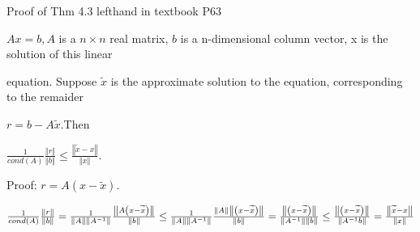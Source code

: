 \documentclass{article}
\begin{document}
Proof of Thm 4.3 lefthand in textbook P63

$Ax=b,A$ is a $n\times n$ real matrix, $b$ is a n-dimensional column vector,
x is the solution of this linear

equation. Suppose $\widetilde{x}$ is the approximate solution to the
equation, corresponding to the remaider 

$r=b-A\widetilde{x}.$Then 

$\frac{1}{cond(A)}\frac{\left\Vert r\right\Vert }{\left\Vert b\right\Vert }%
\leq \frac{\left\Vert \widetilde{x}-x\right\Vert }{\left\Vert x\right\Vert }.
$

Proof: $r=A\left( x-\widetilde{x}\right) .$

$\frac{1}{cond(A)}\frac{\left\Vert r\right\Vert }{\left\Vert b\right\Vert }=%
\frac{1}{\left\Vert A\right\Vert \left\Vert A^{-1}\right\Vert }\frac{%
\left\Vert A\left( x-\widetilde{x}\right) \right\Vert }{\left\Vert
b\right\Vert }\leq \frac{1}{\left\Vert A\right\Vert \left\Vert
A^{-1}\right\Vert }\frac{\left\Vert A\right\Vert \left\Vert \left( x-%
\widetilde{x}\right) \right\Vert }{\left\Vert b\right\Vert }=\frac{%
\left\Vert \left( x-\widetilde{x}\right) \right\Vert }{\left\Vert
A^{-1}\right\Vert \left\Vert b\right\Vert }\leq \frac{\left\Vert \left( x-%
\widetilde{x}\right) \right\Vert }{\left\Vert A^{-1}b\right\Vert }=\frac{%
\left\Vert \widetilde{x}-x\right\Vert }{\left\Vert x\right\Vert }$
\end{document}
